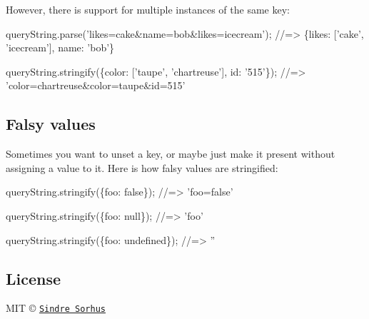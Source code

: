 However, there is support for multiple instances of the same key\+:


\begin{DoxyCode}
queryString.parse('likes=cake&name=bob&likes=icecream');
//=> \{likes: ['cake', 'icecream'], name: 'bob'\}

queryString.stringify(\{color: ['taupe', 'chartreuse'], id: '515'\});
//=> 'color=chartreuse&color=taupe&id=515'
\end{DoxyCode}


\subsection*{Falsy values}

Sometimes you want to unset a key, or maybe just make it present without assigning a value to it. Here is how falsy values are stringified\+:


\begin{DoxyCode}
queryString.stringify(\{foo: false\});
//=> 'foo=false'

queryString.stringify(\{foo: null\});
//=> 'foo'

queryString.stringify(\{foo: undefined\});
//=> ''
\end{DoxyCode}


\subsection*{License}

M\+IT © \href{https://sindresorhus.com}{\tt Sindre Sorhus} 